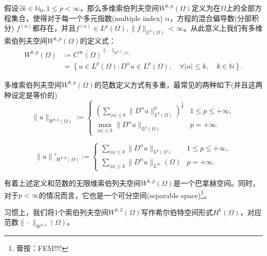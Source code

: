 \begin{definition}[索伯列夫空间]
假设$\exists k \in \mathbb{N}_0, 1 \le p < \infty$，那么多维索伯列夫空间$W^{k,p}(\Omega)$定义为在$\Omega$上的全部方程集合，使得对于每一个多元指数(multiple index) $\alpha$，方程的混合偏导数(分部积分) $f^{(\alpha)}$都存在，并且$f^{(\alpha)} \in L^p(\Omega), \big\| f \big\|_{L^p(\Omega)} < \infty$。从此意义上我们有多维索伯列夫空间$W^{k,p}(\Omega)$的定义式：
\begin{equation}
  \label{eq:sobolev-space-def}
\begin{split}
    W^{k,p}(\Omega) &\coloneqq \overline{C^{\infty}(\Omega)}^{\|\cdot\|_{W^{k,p}(\Omega)}}\\
    &= \left\{ u \in L^p(\Omega): D^{\alpha} u \in L^p (\Omega), \quad \forall \left| \alpha \right| \le k, \quad k \in \mathbb{N} \right\}.
\end{split}
\end{equation}

多维索伯列夫空间$W^{k,p}(\Omega)$的范数定义方式有多重，最常见的两种如下(并且这两种设定是等价的)
\begin{equation}
  \label{eq:sobolev-space-norm-def}
    \|u\|_{W^{k,p}(\Omega)} := \begin{cases}
    \left( \sum_{\left| \alpha \right| \le k} \Big\| D^{\alpha} u \big\|^p_{L^p(\Omega)} \right)^{\frac{1}{p}} & 1 \le p \le +\infty,\\
    \max_{\left| \alpha \right| \le k} \Big\| D^{\alpha} u \Big\| _{L^p(\Omega)} & p = +\infty.
  \end{cases}
\end{equation}

\begin{equation*}
  \|u\|'_{W^{k,p}(\Omega)} :=
  \begin{cases}
    \sum_{\left| \alpha \right| \le k} \Big\| D^{\alpha} u \Big\|_{L^p(\Omega)} & 1 \le p \le +\infty, \\
    \sum_{\left| \alpha \right| \le k} \big\|D^{\alpha} u \Big\|_{L^{\infty}}(\Omega) & p = + \infty.
  \end{cases}
\end{equation*}
\end{definition}

有着上述定义和范数的无限维索伯列夫空间$W^{k,p}(\Omega)$是一个巴拿赫空间。同时，对于$p < \infty$的情况而言，它也是一个可分空间(separable space)\footnote{膏按：FEM!!!!}。

习惯上，我们将1个索伯列夫空间$W^{k,2}(\Omega)$写作希尔伯特空间形式$H^{k}(\Omega)$，对应范数$\big\| \cdot \big\|_{W^{k,2}}(\Omega)$。




